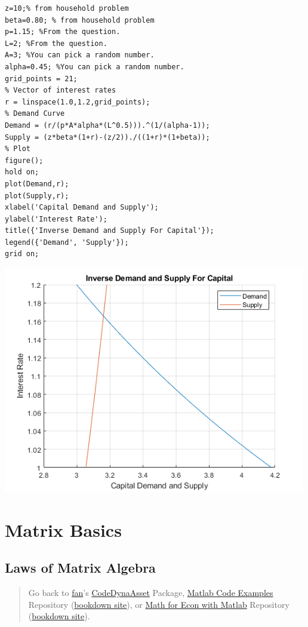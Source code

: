 \documentclass[
]{book}
\begin{document}
\begin{verbatim}
z=10;% from household problem
beta=0.80; % from household problem
p=1.15; %From the question.
L=2; %From the question.
A=3; %You can pick a random number.
alpha=0.45; %You can pick a random number.
grid_points = 21;
% Vector of interest rates
r = linspace(1.0,1.2,grid_points);
% Demand Curve
Demand = (r/(p*A*alpha*(L^0.5))).^(1/(alpha-1));
Supply = (z*beta*(1+r)-(z/2))./((1+r)*(1+beta));
% Plot
figure();
hold on;
plot(Demand,r);
plot(Supply,r);
xlabel('Capital Demand and Supply');
ylabel('Interest Rate');
title({'Inverse Demand and Supply For Capital'});
legend({'Demand', 'Supply'});
grid on;
\end{verbatim}

\includegraphics[width=5.20833in,height=\textheight]{img/K_borrow_firm_images/figure_2.png}

\hypertarget{matrix-basics}{%
\chapter{Matrix Basics}\label{matrix-basics}}

\hypertarget{laws-of-matrix-algebra}{%
\section{Laws of Matrix Algebra}\label{laws-of-matrix-algebra}}

\begin{quote}
Go back to \href{http://fanwangecon.github.io/}{fan}'s \href{https://fanwangecon.github.io/CodeDynaAsset/}{CodeDynaAsset} Package, \href{https://fanwangecon.github.io/M4Econ/}{Matlab Code Examples} Repository (\href{https://fanwangecon.github.io/M4Econ/bookdown}{bookdown site}), or \href{https://fanwangecon.github.io/Math4Econ/}{Math for Econ with Matlab} Repository (\href{https://fanwangecon.github.io/Math4Econ/bookdown}{bookdown site}).
\end{quote}
\end{document}
